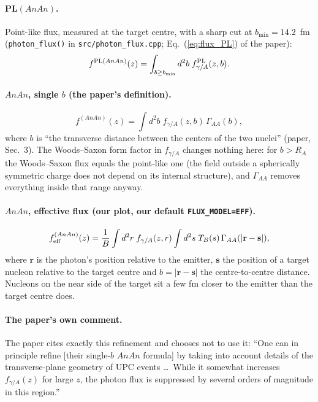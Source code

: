 \documentclass[11pt]{article}
\begin{document}
\paragraph{PL$(AnAn)$.} Point-like flux, measured at the target centre,
with a sharp cut at $b_{\min}=14.2$~fm (\texttt{photon\_flux()} in
\texttt{src/photon\_flux.cpp}; Eq.~(\ref{eq:flux_PL}) of the paper):
\begin{equation}
  f^{{\rm PL}(AnAn)}(z) = \int_{b\ge b_{\min}} d^2b\; f^{\rm PL}_{\gamma/A}(z,b).
  \label{eq:flux_PL}
\end{equation}

\paragraph{$AnAn$, single $b$ (the paper's definition).}
\begin{equation}
  f^{(AnAn)}(z) = \int d^2b\; f_{\gamma/A}(z,b)\,\Gamma_{AA}(b),
\end{equation}
where $b$ is ``the transverse distance between the centers of the two
nuclei'' (paper, Sec.~3). The Woods--Saxon form factor in $f_{\gamma/A}$
changes nothing here: for $b>R_A$ the Woods--Saxon flux equals the
point-like one (the field outside a spherically symmetric charge does not
depend on its internal structure), and $\Gamma_{AA}$ removes everything
inside that range anyway.

\paragraph{$AnAn$, effective flux (our plot, our default \texttt{FLUX\_MODEL=EFF}).}
\begin{equation}
  f^{(AnAn)}_{\rm eff}(z) = \frac{1}{B}\int d^2r\; f_{\gamma/A}(z,r)
  \int d^2s\; T_B(s)\,\Gamma_{AA}(|\mathbf r-\mathbf s|),
\end{equation}
where $\mathbf r$ is the photon's position relative to the emitter,
$\mathbf s$ the position of a target nucleon relative to the target centre
and $b=|\mathbf r-\mathbf s|$ the centre-to-centre distance. Nucleons on the
near side of the target sit a few fm closer to the emitter than the target
centre does.

\paragraph{The paper's own comment.} The paper cites exactly this
refinement and chooses not to use it: ``One can in principle refine
[their single-$b$ $AnAn$ formula] by taking into account details of the
transverse-plane geometry of UPC events \dots\ While it somewhat increases
$f_{\gamma/A}(z)$ for large $z$, the photon flux is suppressed by several
orders of magnitude in this region.''
\end{document}
